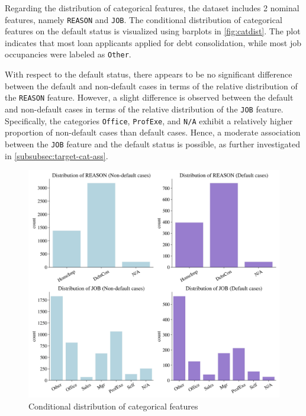 Regarding the distribution of categorical features, the dataset includes 2 nominal features, namely \texttt{REASON} and \texttt{JOB}.
The conditional distribution of categorical features on the default status is visualized using barplots in \autoref{fig:catdist}.
The plot indicates that most loan applicants applied for debt consolidation, while most job occupancies were labeled as \texttt{Other}.

With respect to the default status, there appears to be no significant difference between the default and non-default cases in terms of the relative distribution of the \texttt{REASON} feature.
However, a slight difference is observed between the default and non-default cases in terms of the relative distribution of the \texttt{JOB} feature.
Specifically, the categories \texttt{Office}, \texttt{ProfExe}, and \texttt{N/A} exhibit a relatively higher proportion of non-default cases than default cases.
Hence, a moderate association between the \texttt{JOB} feature and the default status is possible, as further investigated in \autoref{subsubsec:target-cat-ass}.


\begin{figure}[H]
    \centering
    \caption{Conditional distribution of categorical features}\vspace{0.5em}
    \label{fig:catdist}
    \includegraphics[width=140mm]{Figures/Categorical_Features_Distribution.jpg}
    \vspace{-1em}
    \end{figure}

